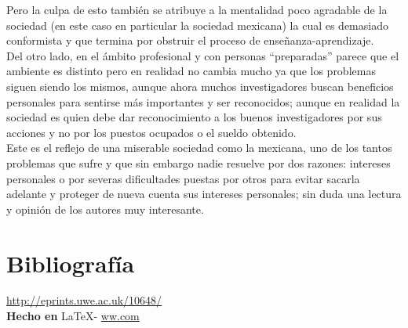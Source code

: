 \documentclass{article}
\begin{document}
{Pero la culpa de esto también se atribuye a la mentalidad poco agradable de la sociedad (en este caso en particular la sociedad mexicana) la cual es demasiado conformista y que termina por obstruir el proceso de enseñanza-aprendizaje.
\\

Del otro lado, en el ámbito profesional y con personas “preparadas” parece que el ambiente es distinto pero en realidad no cambia mucho ya que los problemas siguen siendo los mismos, aunque ahora muchos investigadores buscan beneficios personales para sentirse más importantes y ser reconocidos; aunque en realidad la sociedad es quien debe dar reconocimiento a los buenos investigadores por sus acciones y no por los puestos ocupados o el sueldo obtenido.
\\

Este es el reflejo de una miserable sociedad como la mexicana, uno de los tantos problemas que sufre y que sin embargo nadie resuelve por dos razones: intereses personales o por severas dificultades puestas por otros para evitar sacarla adelante y proteger de nueva cuenta sus intereses personales; sin duda una lectura y opinión de los autores muy interesante.
}

\vspace{1cm}

\section*{Bibliograf\'ia}

\noindent \url{http://eprints.uwe.ac.uk/10648/}
\\

\large{\hfill \textbf{Hecho en } \LaTeX - \url{ww.com}}
\end{document}

